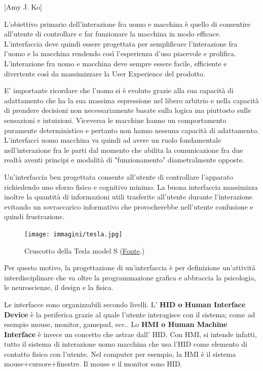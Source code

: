 [Amy J. Ko]
\vspace{\baselineskip}

L'obiettivo primario dell'interazione fra uomo e macchina è quello di consentire all'utente di controllare e far funzionare la macchina in modo efficace.
L'interfaccia deve quindi essere progettata per semplificare l'interazione fra l'uomo e la macchina rendendo così l'esperienza d'uso piacevole e
prolifica. L'interazione fra uomo e macchina deve sempre essere facile, efficiente e divertente così da massimizzare la User Experience del prodotto.

E' importante ricordare che l'uomo si è evoluto grazie alla sua capacità di adattamento che ha la sua massima espressione nel libero arbitrio e nella
capacità di prendere decisioni non necessariamente basate sulla logica ma piuttosto sulle sensazioni e intuizioni. Viceversa le macchine hanno un
comportamento puramente deterministico e pertanto non hanno nessuna capacità di adattamento. L'interfacci uomo macchina va quindi ad avere un ruolo
fondamentale nell'interazione fra le parti dal momento che abilita la comunicazione fra due realtà aventi principi e modalità di "funzionamento"
diametralmente opposte.

Un'interfaccia ben progettata consente all'utente di controllare l'apparato richiedendo uno sforzo fisico e cognitivo minimo. La buona interfaccia
massimizza inoltre la quantità di informazioni utili trasferite all'utente durante l'interazione evitando un sovraccarico informativo che provocherebbe
nell'utente confusione e quindi frustrazione.

\begin{figure}[!h]
	\centering
	\texttt{[image: immagini/tesla.jpg]}
	\caption{Cruscotto della Tesla model S (\href{https://pinxcars.com/2013-tesla-model-s-cockpit/}{\underline{Fonte}}.)}
\end{figure}

Per questo motivo, la progettazione di un'interfaccia è per definizione un'attività interdisciplinare che va oltre la programmazione grafica e
abbraccia la psicologia, le neuroscienze, il design e la fisica.

Le interfacce sono organizzabili secondo livelli. L' \textbf{HID o Human Interface Device} è la periferica grazie al quale l'utente interagisce con
il sistema; come ad esempio mouse, monitor, gamepad, ecc.. Lo \textbf{HMI o Human Machine Interface} è invece un concetto che astrae dall' HID.
Con HMI, si intende infatti, tutto il sistema di interazione uomo macchina che usa l'HID come elemento di contatto fisico con l'utente. Nel computer
per esempio, la HMI è il sistema mouse+cursore+finestre. Il mouse e il monitor sono HID.

